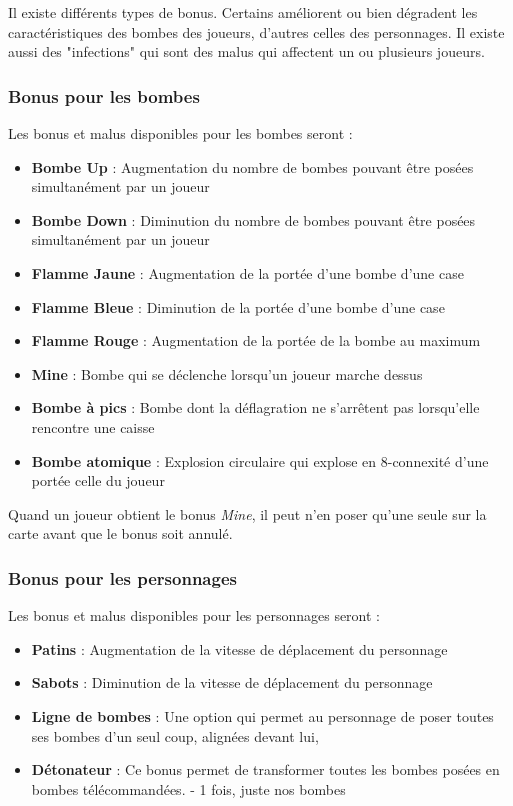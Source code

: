 Il existe différents types de bonus. Certains améliorent ou bien dégradent les caractéristiques des bombes des joueurs, d'autres celles des personnages. Il existe aussi des "infections" qui sont des malus qui affectent un ou plusieurs joueurs.

\subsubsection{Bonus pour les bombes}

Les bonus et malus disponibles pour les bombes seront :
\begin{itemize}
\item \textbf{Bombe Up} : Augmentation du nombre de bombes pouvant être posées simultanément par un joueur
\item \textbf{Bombe Down} : Diminution du nombre de bombes pouvant être posées simultanément par un joueur
\item \textbf{Flamme Jaune} : Augmentation de la portée d'une bombe d'une case
\item \textbf{Flamme Bleue} : Diminution de la portée d'une bombe d'une case
\item \textbf{Flamme Rouge} : Augmentation de la portée de la bombe au maximum
\item \textbf{Mine} : Bombe qui se déclenche lorsqu'un joueur marche dessus
\item \textbf{Bombe à pics} : Bombe dont la déflagration ne s'arrêtent pas lorsqu'elle rencontre une caisse
\item \textbf{Bombe atomique} : Explosion circulaire qui explose en 8-connexité d'une portée celle du joueur
\end{itemize}

Quand un joueur obtient le bonus \emph{Mine}, il peut n'en poser qu'une seule sur la carte avant que le bonus soit annulé.

\subsubsection{Bonus pour les personnages}

Les bonus et malus disponibles pour les personnages seront :
\begin{itemize}
\item \textbf{Patins} : Augmentation de la vitesse de déplacement du personnage
\item \textbf{Sabots} : Diminution de la vitesse de déplacement du personnage
\item \textbf{Ligne de bombes} : Une option qui permet au personnage de poser toutes ses bombes d'un seul coup, alignées devant lui,
\item \textbf{Détonateur} : Ce bonus permet de transformer toutes les bombes posées en bombes télécommandées. - 1 fois, juste nos bombes
\end{itemize}

